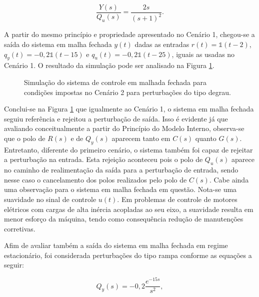 \begin{equation}
    \label{eq:y2qu-cenario2}
    \frac{Y(s)}{Q_{u}(s)} = \frac{2s}{(s + 1)^2}.
\end{equation}

A partir do mesmo princípio e propriedade apresentado no Cenário 1, chegou-se a
saída do sistema em malha fechada $y(t)$ dadas as entradas
$r(t) = \mathds{1}(t - 2)$, $q_{y}(t) = -0,2\mathds{1}(t - 15)$ e
$q_{u}(t) = -0,2\mathds{1}(t - 25)$, iguais as usadas no Cenário 1. O resultado
da simulação pode ser analisado na Figura \ref{fig:resultado-cenario2-a}.

\begin{figure}[!ht]
    \caption{Simulação do sistema de controle em malhada fechada para condições
    impostas no Cenário 2 para perturbações do tipo degrau.}
    \vspace{-10pt}
    \hspace{-30pt}
    \label{fig:resultado-cenario2-a}
    \begin{minipage}{\linewidth}
        
    \end{minipage}
\end{figure}

Conclui-se na Figura \ref{fig:resultado-cenario2-a} que igualmente ao
Cenário 1, o sistema em malha fechada seguiu referência e rejeitou a perturbação
de saída. Isso é evidente já que avaliando conceitualmente a partir do Princípio
do Modelo Interno, observa-se que o polo de $R(s)$ e de $Q_{y}(s)$ aparecem
tanto em $C(s)$ quanto $G(s)$. Entretanto, diferente do primeiro cenário, o
sistema também foi capaz de rejeitar a perturbação na entrada. Esta rejeição
aconteceu pois o polo de $Q_{u}(s)$ aparece no caminho de realimentação da saída
para a perturbação de entrada, sendo nesse caso o cancelamento dos polos
realizados pelo polo de $C(s)$. Cabe ainda uma observação para o sistema em
malha fechada em questão. Nota-se uma suavidade no sinal de controle $u(t)$. Em
problemas de controle de motores elétricos com cargas de alta inércia acopladas
ao seu eixo, a suavidade resulta em menor esforço da máquina, tendo como
consequência redução de manutenções corretivas.

Afim de avaliar também a saída do sistema em malha fechada em regime
estacionário, foi considerada perturbações do tipo rampa conforme as equações
a seguir:

\begin{equation}
    \label{eq:qys-rampa-cenario2}
    Q_{y}(s) = -0,2\frac{e^{-15s}}{s^2},
\end{equation}

